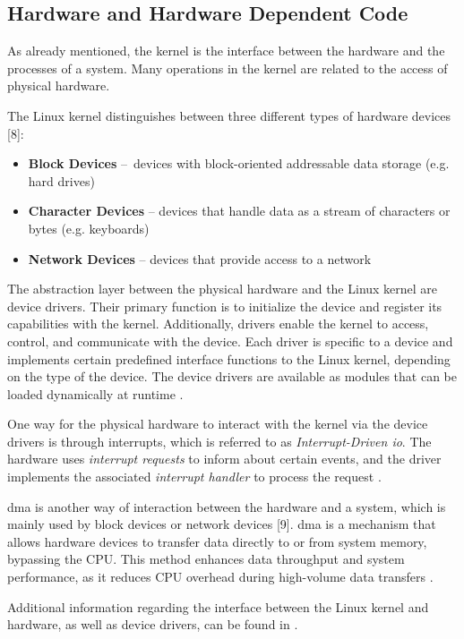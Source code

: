 \subsection{Hardware and Hardware Dependent Code} \label{chap:hwdependcode}

As already mentioned, the kernel is the interface between the hardware and the processes of a system. Many operations in the kernel are related to the access of physical hardware.

The Linux kernel distinguishes between three different types of hardware devices [8]:

\begin{itemize}
\item \textbf{Block Devices} – devices with block-oriented addressable data storage (e.g. hard drives)
\item \textbf{Character Devices} – devices that handle data as a stream of characters or bytes (e.g. keyboards)
\item \textbf{Network Devices} – devices that provide access to a network
\end{itemize}

The abstraction layer between the physical hardware and the Linux kernel are device drivers. Their primary function is to initialize the device and register its capabilities with the kernel. Additionally, drivers enable the kernel to access, control, and communicate with the device. Each driver is specific to a device and implements certain predefined interface functions to the Linux kernel, depending on the type of the device. The device drivers are available as modules that can be loaded dynamically at runtime \cite{like09}.

One way for the physical hardware to interact with the kernel via the device drivers is through interrupts, which is referred to as \textit{Interrupt-Driven \ac{io}}. The hardware uses \textit{interrupt requests} to inform about certain events, and the driver implements the associated \textit{interrupt handler} to process the request \cite{like09}.

\ac{dma} is another way of interaction between the hardware and a system, which is mainly used by block devices or network devices [9]. \ac{dma} is a mechanism that allows hardware devices to transfer data directly to or from system memory, bypassing the \ac{CPU}. This method enhances data throughput and system performance, as it reduces \ac{CPU} overhead during high-volume data transfers \cite{like05}.

Additional information regarding the interface between the Linux kernel and hardware, as well as device drivers, can be found in \cite{like09}.


